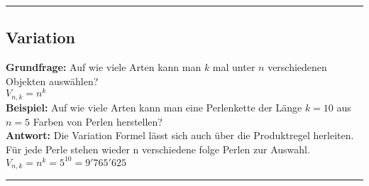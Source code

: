 \hrule

\subsection{Variation}
\textbf{Grundfrage:} Auf wie viele Arten kann man $k$ mal unter $n$ verschiedenen Objekten auswählen?\\[5pt]
$ \boxed{ V_{n, k}=n^{k} }$\\[5pt]
\textbf{Beispiel:} Auf wie viele Arten kann man eine Perlenkette der Länge $k=10$ aus $n=5$ Farben von Perlen herstellen?\\
\textbf{Antwort:} Die Variation Formel lässt sich auch über die Produktregel herleiten. Für jede Perle stehen wieder n verschiedene folge Perlen zur Auswahl. $ V_{n,k} = n^k = 5^10 = 9'765'625$

\hrule
